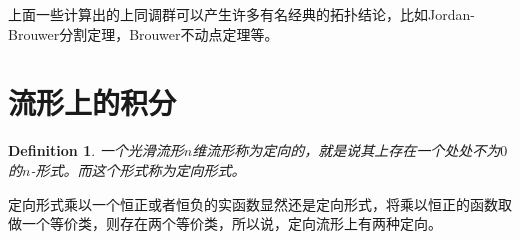 \documentclass[8pt]{book}
\theoremstyle{plain}%
\newtheorem{defi}{Definition}[section]%
\begin{document}
上面一些计算出的上同调群可以产生许多有名经典的拓扑结论，比如Jordan-Brouwer分割定理，Brouwer不动点定理等。

\section{流形上的积分}
\begin{defi}
一个光滑流形$n$维流形称为定向的，就是说其上存在一个处处不为$0$的$n$-形式。而这个形式称为定向形式。
\end{defi}
定向形式乘以一个恒正或者恒负的实函数显然还是定向形式，将乘以恒正的函数取做一个等价类，则存在两个等价类，所以说，定向流形上有两种定向。
\end{document}
